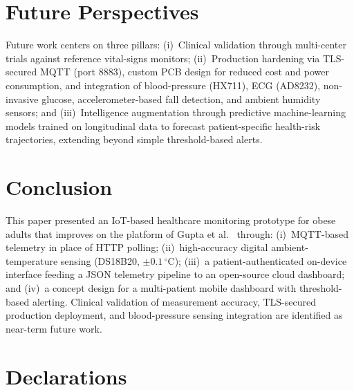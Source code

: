 \documentclass[pdflatex,sn-mathphys-num]{sn-jnl}
\begin{document}
\section{Future Perspectives}\label{sec:future}

Future work centers on three pillars: (i)~Clinical validation through
multi-center trials against reference vital-signs monitors;
(ii)~Production hardening via TLS-secured MQTT (port 8883), custom
PCB design for reduced cost and power consumption, and integration of
blood-pressure (HX711), ECG (AD8232), non-invasive glucose,
accelerometer-based fall detection, and ambient humidity sensors; and
(iii)~Intelligence augmentation through predictive machine-learning
models trained on longitudinal data to forecast patient-specific
health-risk trajectories, extending beyond simple threshold-based
alerts.

\section{Conclusion}\label{sec:conclusion}

This paper presented an IoT-based healthcare monitoring prototype for
obese adults that improves on the platform of Gupta et
al.~\cite{gupta2020} through: (i)~MQTT-based telemetry in place of
HTTP polling; (ii)~high-accuracy digital ambient-temperature
sensing (DS18B20, $\pm0.1\,^\circ$C); (iii)~a patient-authenticated
on-device interface feeding a JSON telemetry pipeline to an
open-source cloud dashboard; and (iv)~a concept design for a
multi-patient mobile dashboard with threshold-based alerting. Clinical
validation of measurement accuracy, TLS-secured production deployment,
and blood-pressure sensing integration are identified as near-term
future work.

\backmatter

\section*{Declarations}
\end{document}
